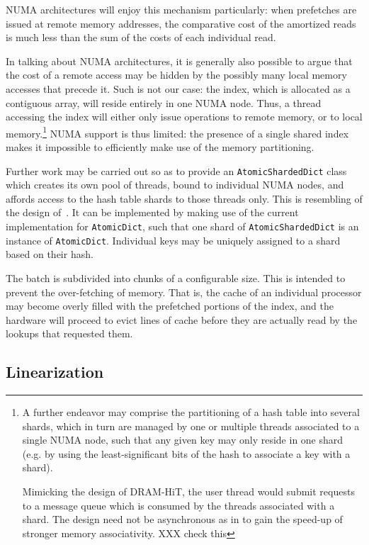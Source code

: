 NUMA architectures will enjoy this mechanism particularly: when prefetches are issued at remote memory addresses, the comparative cost of the amortized reads is much less than the sum of the costs of each individual read.

In talking about NUMA architectures, it is generally also possible to argue that the cost of a remote access may be hidden by the possibly many local memory accesses that precede it.
Such is not our case: the index, which is allocated as a contiguous array, will reside entirely in one NUMA node.
Thus, a thread accessing the index will either only issue operations to remote memory, or to local memory.\footnote{%
	A further endeavor may comprise the partitioning of a hash table into several shards, which in turn are managed by one or multiple threads associated to a single NUMA node, such that any given key may only reside in one shard (e.g. by using the least-significant bits of the hash to associate a key with a shard).
	
	Mimicking the design of DRAM-HiT, the user thread would submit requests to a message queue which is consumed by the threads associated with a shard.
	The design need not be asynchronous as in \cite{dramhit} to gain the speed-up of stronger memory associativity. XXX check this
}
NUMA support is thus limited: the presence of a single shared index makes it impossible to efficiently make use of the memory partitioning.

Further work may be carried out so as to provide an \texttt{AtomicShardedDict} class which creates its own pool of threads, bound to individual NUMA nodes, and affords access to the hash table shards to those threads only.
This is resembling of the design of~\cite{dramhit}.
It can be implemented by making use of the current implementation for \texttt{AtomicDict}, such that one shard of \texttt{AtomicShardedDict} is an instance of \texttt{AtomicDict}.
Individual keys may be uniquely assigned to a shard based on their hash.

The batch is subdivided into chunks of a configurable size.
This is intended to prevent the over-fetching of memory.
That is, the cache of an individual processor may become overly filled with the prefetched portions of the index, and the hardware will proceed to evict lines of cache before they are actually read by the lookups that requested them.

\subsection{Linearization}


